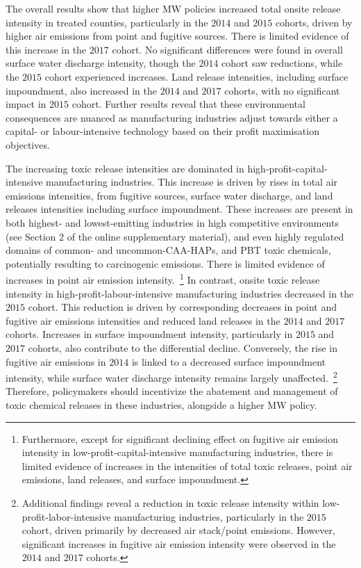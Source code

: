 \documentclass[authoryear, preprint, twocolumn, 1p]{elsarticle}
\begin{document}
    The overall results show that higher MW policies increased total onsite release intensity in treated counties, particularly in the $2014$ and $2015$ cohorts, driven by higher air emissions from point and fugitive sources. There is limited evidence of this increase in the $2017$ cohort. No significant differences were found in overall surface water discharge intensity, though the $2014$ cohort saw reductions, while the $2015$ cohort experienced increases. Land release intensities, including surface impoundment, also increased in the $2014$ and $2017$ cohorts, with no significant impact in $2015$ cohort. Further results reveal that these environmental consequences are nuanced as manufacturing industries adjust towards either a capital- or labour-intensive technology based on their profit maximisation objectives.

    The increasing toxic release intensities are dominated in high-profit-capital-intensive manufacturing industries. This increase is driven by rises in total air emissions intensities, from fugitive sources, surface water discharge, and land releases intensities including surface impoundment. These increases are present in both highest- and lowest-emitting industries in high competitive environments (see Section $2$ of the online supplementary material), and even highly regulated domains of common- and uncommon-CAA-HAPs, and PBT toxic chemicals, potentially resulting to carcinogenic emissions. There is limited evidence of increases in point air emission intensity.~\footnote{\tiny Furthermore, except for significant declining effect on fugitive air emission intensity in low-profit-capital-intensive manufacturing industries, there is limited evidence of increases in the intensities of total toxic releases, point air emissions, land releases, and surface impoundment.} In contrast, onsite toxic release intensity in high-profit-labour-intensive manufacturing industries decreased in the $2015$ cohort. This reduction is driven by corresponding decreases in point and fugitive air emissions intensities and reduced land releases in the $2014$ and $2017$ cohorts. Increases in surface impoundment intensity, particularly in $2015$ and $2017$ cohorts, also contribute to the differential decline. Conversely, the rise in fugitive air emissions in $2014$ is linked to a decreased surface impoundment intensity, while surface water discharge intensity remains largely unaffected.~\footnote{\tiny Additional findings reveal a reduction in toxic release intensity within low-profit-labor-intensive manufacturing industries, particularly in the $2015$ cohort, driven primarily by decreased air stack/point emissions. However, significant increases in fugitive air emission intensity were observed in the $2014$ and $2017$ cohorts.} Therefore, policymakers should incentivize the abatement and management of toxic chemical releases in these industries, alongside a higher MW policy.
\end{document}
